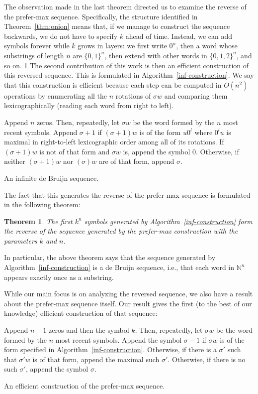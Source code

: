\documentclass{article}
\newtheorem{theorem}{Theorem}
\theoremstyle{definition}
\newcommand{\N}{{\mathbb{N}}}
\begin{document}
The observation made in the last theorem directed us to examine the reverse of the prefer-max sequence. Specifically, the structure identified in Theorem~\ref{thm:onion} means that, if we manage to construct the sequence backwards, we do not have to specify $k$ ahead of time. Instead, we can add symbols forever while $k$ grows in layers: we first write $0^n$, then a word whose substrings of length $n$ are $\{0,1\}^n$, then extend with other words in $\{0,1,2\}^n$, and so on.
1
The second contribution of this work is then an efficient construction of this reversed sequence. This is formulated in Algorithm~\ref{inf-construction}. We say that this construction is efficient because each step can be computed in $O(n^2)$ operations by enumerating all the $n$ rotations of $\sigma w$ and comparing them lexicographically (reading each word from right to left).


\begin{algorithm}[!h]
	Append $n$ zeros. Then, repeatedly, let $\sigma w$ be the word formed by the $n$ most recent symbols. Append $\sigma+1$ if $(\sigma+1)w$ is of the form $u0^l$ where $0^lu$ is maximal in right-to-left lexicographic order among all of its rotations. If $(\sigma+1)w$ is not of that form and $\sigma w$ is, append the symbol $0$. Otherwise, if neither $(\sigma+1)w$ nor $(\sigma)w$ are of that form, append $\sigma$.
	\caption{An infinite de Bruijn sequence.}
	\label{inf-construction}
\end{algorithm}

The fact that this generates the reverse of the prefer-max sequence is formulated in the following theorem:
 
\begin{theorem} 
The first $k^n$ symbols generated by Algorithm~\ref{inf-construction} form the reverse of the sequence generated by the prefer-max construction with the parameters $k$ and $n$.	
\end{theorem} 

In particular, the above theorem says that the sequence generated by Algorithm~\ref{inf-construction} is a de Bruijn sequence, i.e., that each word in $\N^n$ appears exactly once as a substring.

While our main focus is on analyzing the reversed sequence, we also have a result about the prefer-max sequence itself. Our result gives the first (to the best of our knowledge) efficient construction of that sequence:

\begin{algorithm}
	Append $n-1$ zeros and then the symbol $k$. Then, repeatedly, let $\sigma w$ be the word formed by the $n$ most recent symbols. Append the symbol $\sigma-1$  if $\sigma w$  is of the form specified in Algorithm~\ref{inf-construction}. Otherwise, if there is a  $\sigma'$ such that $\sigma'w$ is of that form, append the maximal such $\sigma'$. Otherwise, if there is no such $\sigma'$, append the symbol $\sigma$.
		
	\caption{An efficient construction of the prefer-max sequence.}
	\label{efficient-pref-max}
\end{algorithm}
\end{document}
